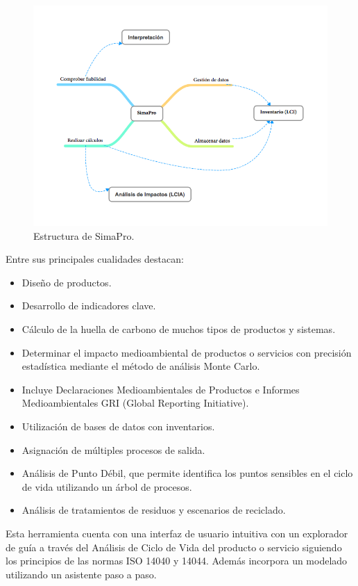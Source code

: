 \begin{figure}[!htb]
\centering
\includegraphics[width=15cm]{simapro.png}
\caption{Estructura de SimaPro.}
\label{fig:simapro}
\end{figure}

Entre sus principales cualidades destacan:

\begin{itemize}
  \item Diseño de productos.
  \item Desarrollo de indicadores clave.
  \item Cálculo de la huella de carbono de muchos tipos de productos y sistemas.
  \item Determinar el impacto medioambiental de productos o servicios con precisión estadística mediante el método de análisis Monte Carlo.
  \item Incluye Declaraciones Medioambientales de Productos e Informes Medioambientales GRI (Global Reporting Initiative).
  \item Utilización de bases de datos con inventarios.
  \item Asignación de múltiples procesos de salida.
  \item Análisis de Punto Débil, que permite identifica los puntos sensibles en el ciclo de vida utilizando un árbol de procesos.
  \item Análisis de tratamientos de residuos y escenarios de reciclado.
\end{itemize}

Esta herramienta cuenta con una interfaz de usuario intuitiva con un explorador de guía a través del Análisis de Ciclo de Vida del producto o servicio siguiendo los principios de las normas ISO 14040 y 14044. Además incorpora un modelado utilizando un asistente paso a paso.

